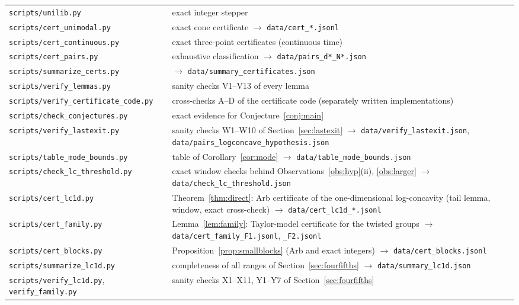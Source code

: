 \documentclass[11pt,a4paper]{article}
\theoremstyle{definition}
\begin{document}
{\small\begin{tabular}{@{}p{}p{}@{}}
\toprule
\texttt{scripts/unilib.py}&exact integer stepper\\
\texttt{scripts/cert\_unimodal.py}&exact cone certificate $\to$ \texttt{data/cert\_*.jsonl}\\
\texttt{scripts/cert\_continuous.py}&exact three-point certificates (continuous time)\\
\texttt{scripts/cert\_pairs.py}&exhaustive classification $\to$ \texttt{data/pairs\_d*\_N*.json}\\
\texttt{scripts/summarize\_certs.py}&$\to$ \texttt{data/summary\_certificates.json}\\
\texttt{scripts/verify\_lemmas.py}&sanity checks V1--V13 of every lemma\\
\texttt{scripts/verify\_certificate\_code.py}&cross-checks A--D of the certificate code (separately written implementations)\\
\texttt{scripts/check\_conjectures.py}&exact evidence for Conjecture~\ref{conj:main}\\
\texttt{scripts/verify\_lastexit.py}&sanity checks W1--W10 of Section~\ref{sec:lastexit} $\to$ \texttt{data/verify\_lastexit.json}, \texttt{data/pairs\_logconcave\_hypothesis.json}\\
\texttt{scripts/table\_mode\_bounds.py}&table of Corollary~\ref{cor:mode} $\to$ \texttt{data/table\_mode\_bounds.json}\\
\texttt{scripts/check\_lc\_threshold.py}&exact window checks behind Observations~\ref{obs:hyp}(ii), \ref{obs:larger} $\to$ \texttt{data/check\_lc\_threshold.json}\\
\texttt{scripts/cert\_lc1d.py}&Theorem~\ref{thm:direct}: Arb certificate of the one-dimensional log-concavity (tail lemma, window, exact cross-check) $\to$ \texttt{data/cert\_lc1d\_*.jsonl}\\
\texttt{scripts/cert\_family.py}&Lemma~\ref{lem:family}: Taylor-model certificate for the twisted groups $\to$ \texttt{data/cert\_family\_F1.jsonl}, \texttt{\_F2.jsonl}\\
\texttt{scripts/cert\_blocks.py}&Proposition~\ref{prop:smallblocks} (Arb and exact integers) $\to$ \texttt{data/cert\_blocks.jsonl}\\
\texttt{scripts/summarize\_lc1d.py}&completeness of all ranges of Section~\ref{sec:fourfifths} $\to$ \texttt{data/summary\_lc1d.json}\\
\texttt{scripts/verify\_lc1d.py}, \texttt{verify\_family.py}&sanity checks X1--X11, Y1--Y7 of Section~\ref{sec:fourfifths}\\

\end{tabular}}
\end{document}
